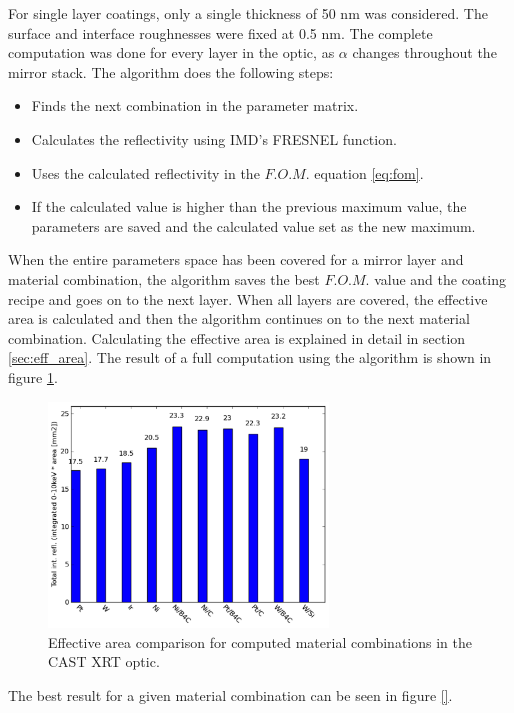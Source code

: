 For single layer coatings, only a single thickness of 50 nm was considered. The surface and interface roughnesses were fixed at 0.5 nm. The complete computation was done for every layer in the optic, as $\alpha$ changes throughout the mirror stack. The algorithm does the following steps:
\begin{itemize}
  \item[\bf 1] Finds the next combination in the parameter matrix.
  \item[\bf 2] Calculates the reflectivity using IMD's FRESNEL function.
  \item[\bf 3] Uses the calculated reflectivity in the $F.O.M.$ equation \ref{eq:fom}.
  \item[\bf 4] If the calculated value is higher than the previous maximum value, the parameters are saved and the calculated value set as the new maximum.
\end{itemize}

When the entire parameters space has been covered for a mirror layer and material combination, the algorithm saves the best $F.O.M.$ value and the coating recipe and goes on to the next layer. When all layers are covered, the effective area is calculated and then the algorithm continues on to the next material combination. Calculating the effective area is explained in detail in section \ref{sec:eff_area}. The result of a full computation using the algorithm is shown in figure \ref{fig:mat_result}.

\begin{figure}[htbp]
  \centering
    \includegraphics[height=6cm]{figures/cast/mat_result.png}
  \caption{\footnotesize Effective area comparison for computed material combinations in the CAST XRT optic.}
  \label{fig:mat_result}
\end{figure}

The best result for a given material combination can be seen in figure \ref{}.

